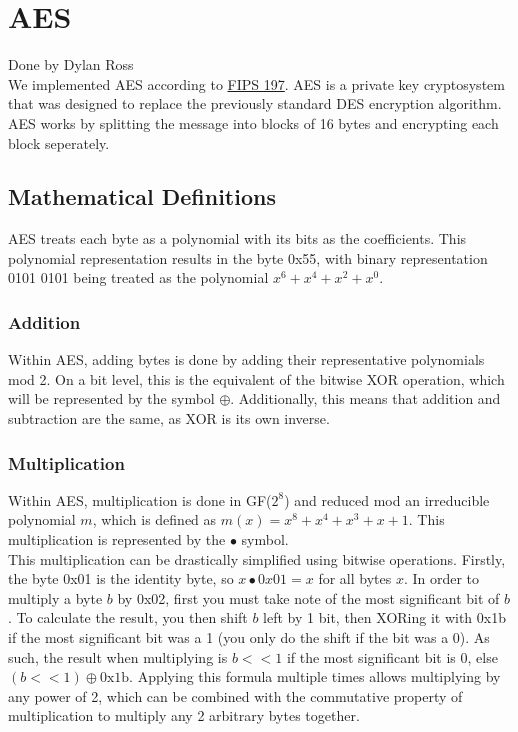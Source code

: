 \section{AES}\label{sec:aes}
Done by Dylan Ross\\

	\medskip
	We implemented AES according to \href{https://nvlpubs.nist.gov/nistpubs/FIPS/NIST.FIPS.197.pdf}{FIPS 197}. AES is a private key cryptosystem that was designed to replace the previously
	standard DES encryption algorithm. AES works by splitting the message into blocks of 16 bytes and encrypting each block seperately.

	\subsection{Mathematical Definitions}\label{sec:aes-math}
		AES treats each byte as a polynomial with its bits as the coefficients. This polynomial representation results in the byte 0x55, with binary representation 0101 0101 being treated as 
		the polynomial $x^6+x^4+x^2+x^0$.

		\subsubsection{Addition}\label{sec:aes-add}
			Within AES, adding bytes is done by adding their representative polynomials mod 2. On a bit level, this is the equivalent of the bitwise XOR operation, which will be represented by
			the symbol $\oplus$. Additionally, this means that addition and subtraction are the same, as XOR is its own inverse.

		\subsubsection{Multiplication}\label{sec:aes-mult}
			Within AES, multiplication is done in GF($2^8$) and reduced mod an irreducible polynomial $m$, which is defined as $m(x)=x^8+x^4+x^3+x+1$. This multiplication is represented by the
			$\bullet$ symbol.\\

			This multiplication can be drastically simplified using bitwise operations. Firstly, the byte 0x01 is the identity byte, so $x\bullet0x01=x$ for all bytes $x$. In order to multiply
			a byte $b$ by 0x02, first you must take note of the most significant bit of $b$. To calculate the result, you then shift $b$ left by 1 bit, then XORing it with 0x1b if the most
			significant bit was a 1 (you only do the shift if the bit was a 0). As such, the result when multiplying is $b<<1$ if the most significant bit is 0, else $(b<<1)\oplus\text{0x1b}$.
			Applying this formula multiple times allows multiplying by any power of 2, which can be combined with the commutative property of multiplication to multiply any 2 arbitrary bytes
			together.

